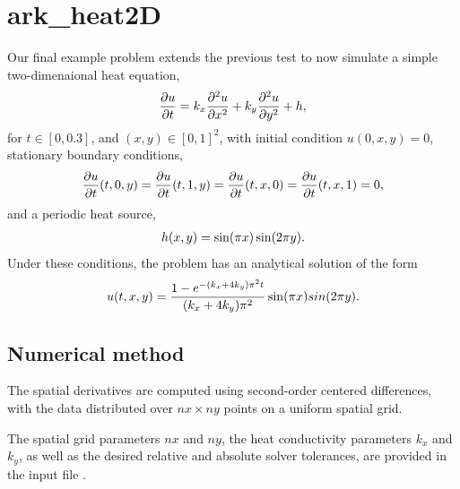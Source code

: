 \documentclass[letterpaper,10pt,english]{sphinxmanual}
\begin{document}
\chapter{ark\_heat2D}
\label{ark_heat2D:ark-heat2d}\label{ark_heat2D::doc}\label{ark_heat2D:id1}
Our final example problem extends the previous test to now simulate a
simple two-dimenaional heat equation,
\begin{gather}
\begin{split}\frac{\partial u}{\partial t} = k_x \frac{\partial^2 u}{\partial x^2}
                              + k_y \frac{\partial^2 u}{\partial y^2} + h,\end{split}\notag
\end{gather}
for $t \in [0, 0.3]$, and $(x,y) \in [0, 1]^2$, with initial
condition $u(0,x,y) = 0$, stationary boundary conditions,
\begin{gather}
\begin{split}\frac{\partial u}{\partial t}(t,0,y) = \frac{\partial u}{\partial t}(t,1,y) =
\frac{\partial u}{\partial t}(t,x,0) = \frac{\partial u}{\partial t}(t,x,1) = 0,\end{split}\notag
\end{gather}
and a periodic heat source,
\begin{gather}
\begin{split}h(x,y) = \sin(\pi x) \sin(2\pi y).\end{split}\notag
\end{gather}
Under these conditions, the problem has an analytical solution of the
form
\begin{gather}
\begin{split}u(t,x,y) = \frac{1 - e^{-(k_x+4k_y)\pi^2 t}}{(k_x+4k_y)\pi^2} \sin(\pi x) sin(2\pi y).\end{split}\notag
\end{gather}

\section{Numerical method}
\label{ark_heat2D:numerical-method}
The spatial derivatives are computed using second-order
centered differences, with the data distributed over $nx\times
ny$ points on a uniform spatial grid.

The spatial grid parameters $nx$ and $ny$, the heat
conductivity parameters $k_x$ and $k_y$, as well as the
desired relative and absolute solver tolerances, are provided in the
input file .
\end{document}
